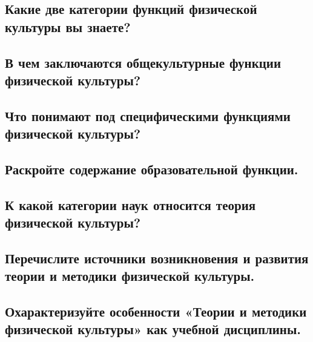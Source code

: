 \subsection{Какие две категории функций физической культуры вы знаете?}



\subsection{В чем заключаются общекультурные функции физической культуры?}



\subsection{Что понимают под специфическими функциями физической культуры?}



\subsection{Раскройте содержание образовательной функции.}



\subsection{К какой категории наук относится теория физической культуры?}



\subsection{Перечислите источники возникновения и развития теории и методики физической культуры.}



\subsection{Охарактеризуйте особенности «Теории и методики физической культуры» как учебной дисциплины.}
